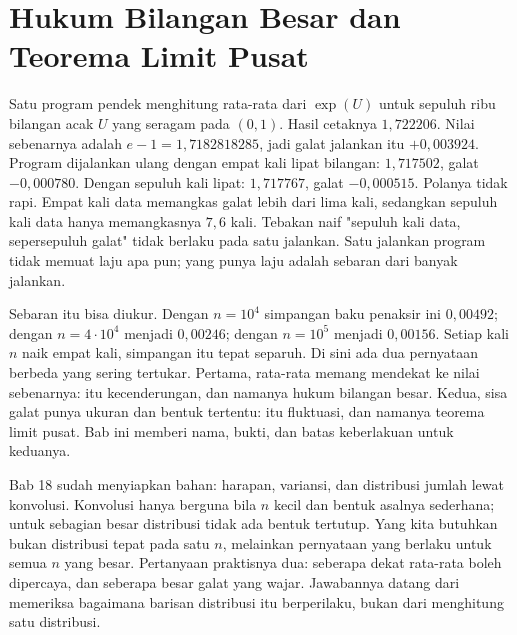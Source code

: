 \chapter{Hukum Bilangan Besar dan Teorema Limit Pusat}

Satu program pendek menghitung rata-rata dari $\exp(U)$ untuk sepuluh ribu bilangan
acak $U$ yang seragam pada $(0,1)$. Hasil cetaknya $1{,}722206$. Nilai sebenarnya
adalah $e-1=1{,}7182818285$, jadi galat jalankan itu $+0{,}003924$. Program
dijalankan ulang dengan empat kali lipat bilangan: $1{,}717502$, galat
$-0{,}000780$. Dengan sepuluh kali lipat: $1{,}717767$, galat $-0{,}000515$.
Polanya tidak rapi. Empat kali data memangkas galat lebih dari lima kali, sedangkan
sepuluh kali data hanya memangkasnya $7{,}6$ kali. Tebakan naif "sepuluh kali data,
sepersepuluh galat" tidak berlaku pada satu jalankan. Satu jalankan program tidak
memuat laju apa pun; yang punya laju adalah sebaran dari banyak jalankan.

Sebaran itu bisa diukur. Dengan $n=10^4$ simpangan baku penaksir ini $0{,}00492$;
dengan $n=4\cdot10^4$ menjadi $0{,}00246$; dengan $n=10^5$ menjadi $0{,}00156$.
Setiap kali $n$ naik empat kali, simpangan itu tepat separuh. Di sini ada dua
pernyataan berbeda yang sering tertukar. Pertama, rata-rata memang mendekat ke
nilai sebenarnya: itu kecenderungan, dan namanya hukum bilangan besar. Kedua, sisa
galat punya ukuran dan bentuk tertentu: itu fluktuasi, dan namanya teorema limit
pusat. Bab ini memberi nama, bukti, dan batas keberlakuan untuk keduanya.

Bab 18 sudah menyiapkan bahan: harapan, variansi, dan distribusi jumlah lewat
konvolusi. Konvolusi hanya berguna bila $n$ kecil dan bentuk asalnya sederhana;
untuk sebagian besar distribusi tidak ada bentuk tertutup. Yang kita butuhkan
bukan distribusi tepat pada satu $n$, melainkan pernyataan yang berlaku untuk
semua $n$ yang besar. Pertanyaan praktisnya dua: seberapa dekat rata-rata boleh
dipercaya, dan seberapa besar galat yang wajar. Jawabannya datang dari
memeriksa bagaimana barisan distribusi itu berperilaku, bukan dari menghitung
satu distribusi.

